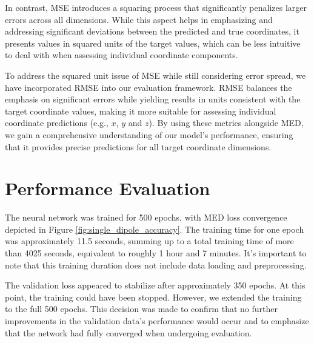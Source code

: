 \documentclass[a4paper, UKenglish, 11pt]{uiomaster}
\begin{document}
In contrast, MSE introduces a squaring process that significantly penalizes larger errors across all dimensions. While this aspect helps in emphasizing and addressing significant deviations between the predicted and true coordinates, it presents values in squared units of the target values, which can be less intuitive to deal with when assessing individual coordinate components.

To address the squared unit issue of MSE while still considering error spread, we have incorporated RMSE into our evaluation framework. RMSE balances the emphasis on significant errors while yielding results in units consistent with the target coordinate values, making it more suitable for assessing individual coordinate predictions (e.g., $x$, $y$ and $z$). By using these metrics alongside MED, we gain a comprehensive understanding of our model's performance, ensuring that it provides precise predictions for all target coordinate dimensions.


%
%



\section{Performance Evaluation}
The neural network was trained for 500 epochs, with MED loss convergence depicted in Figure \ref{fig:single_dipole_accuracy}. The training time for one epoch was approximately 11.5 seconds, summing up to a total training time of more than 4025 seconds, equivalent to roughly 1 hour and 7 minutes. It's important to note that this training duration does not include data loading and preprocessing.

The validation loss appeared to stabilize after approximately 350 epochs. At this point, the training could have been stopped. However, we extended the training to the full 500 epochs. This decision was made to confirm that no further improvements in the validation data's performance would occur and to emphasize that the network had fully converged when undergoing evaluation.
\end{document}
